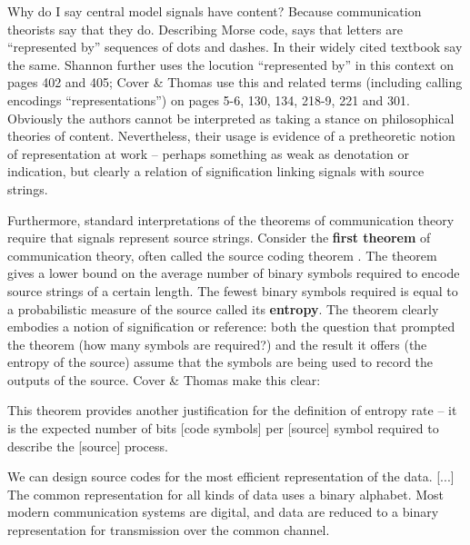 Why do I say central model signals have content?
Because communication theorists say that they do.
Describing Morse code, \citet[385]{shannon1948mathematicalc} says that letters are ``represented by'' sequences of dots and dashes.
In their widely cited textbook \citet[105]{cover2006elements} say the same.
Shannon further uses the locution ``represented by'' in this context on pages 402 and 405; Cover \& Thomas use this and related terms (including calling encodings ``representations'') on pages 5-6, 130, 134, 218-9, 221 and 301.
Obviously the authors cannot be interpreted as taking a stance on philosophical theories of content.
Nevertheless, their usage is evidence of a pretheoretic notion of representation at work -- perhaps something as weak as denotation or indication, but clearly a relation of signification linking signals with source strings.

Furthermore, standard interpretations of the theorems of communication theory require that signals represent source strings.
Consider the \textbf{first theorem} of communication theory, often called the source coding theorem \citep[$\S$5]{cover2006elements} \citep[$\S$4]{mackay2003information}.
The theorem gives a lower bound on the average number of binary symbols required to encode source strings of a certain length.
The fewest binary symbols required is equal to a probabilistic measure of the source called its \textbf{entropy}.
The theorem clearly embodies a notion of signification or reference: both the question that prompted the theorem (how many symbols are required?) and the result it offers (the entropy of the source) assume that the symbols are being used to record the outputs of the source.
Cover \& Thomas make this clear:

\begin{myquote}
This theorem provides another justification for the definition of entropy rate -- it is the expected number of bits [code symbols] per [source] symbol required to describe the [source] process.
\par\hspace*{\fill}\citet[115]{cover2006elements}
\end{myquote}

\begin{myquote}
We can design source codes for the most efficient representation of the data. [...] The common representation for all kinds of data uses a binary alphabet. Most modern communication systems are digital, and data are reduced to a binary representation for transmission over the common channel.
\par\hspace*{\fill}\citet[218]{cover2006elements}
\end{myquote}


